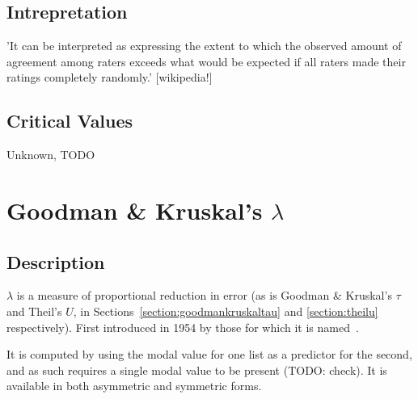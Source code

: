 \documentclass[11pt]{article}
\begin{document}
\subsection{Intrepretation}
'It can be interpreted as expressing the extent to which the observed amount of agreement among raters exceeds what would be expected if all raters made their ratings completely randomly.' [wikipedia!]

\subsection{Critical Values}
Unknown, TODO







\section{Goodman \& Kruskal's $\lambda$}
\label{section:goodmankruskallambda}
\subsection{Description}
$\lambda$ is a measure of proportional reduction in error (as is Goodman \& Kruskal's $\tau$ and Theil's $U$, in Sections~\ref{section:goodmankruskaltau} and \ref{section:theilu} respectively).  First introduced in 1954 by those for which it is named~\cite{goodman1954measures}.

It is computed by using the modal value for one list as a predictor for the second, and as such requires a single modal value to be present (TODO: check).  It is available in both asymmetric and symmetric forms.

\end{document}

